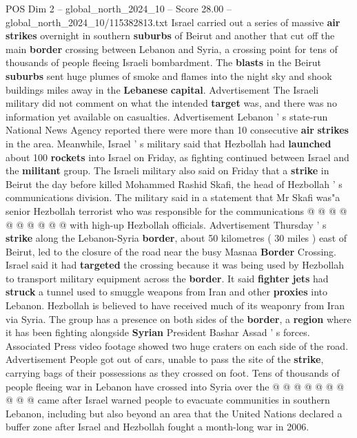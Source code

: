 \begin{textsample}{POS Dim 2 – global\_north\_2024\_10 – Score 28.00 – global\_north\_2024\_10/115382813.txt}  \label{ex:f2_pos_074}
Israel carried out a series of massive \textbf{air} \textbf{strikes} overnight in southern \textbf{suburbs} of Beirut and another that cut off the main \textbf{border} crossing between Lebanon and Syria, a crossing point for tens of thousands of people fleeing Israeli bombardment.
The \textbf{blasts} in the Beirut \textbf{suburbs} sent huge plumes of smoke and flames into the night sky and shook buildings miles away in the \textbf{Lebanese} \textbf{capital}.
Advertisement The Israeli military did not comment on what the intended \textbf{target} was, and there was no information yet available on casualties.
Advertisement Lebanon ' s state-run National News Agency reported there were more than 10 consecutive \textbf{air} \textbf{strikes} in the area.
Meanwhile, Israel ' s military said that Hezbollah had \textbf{launched} about 100 \textbf{rockets} into Israel on Friday, as fighting continued between Israel and the \textbf{militant} group.
The Israeli military also said on Friday that a \textbf{strike} in Beirut the day before killed Mohammed Rashid Skafi, the head of Hezbollah ' s communications division.
The military said in a statement that Mr Skafi was"a senior Hezbollah terrorist who was responsible for the communications @ @ @ @ @ @ @ @ @ @ with high-up Hezbollah officials.
Advertisement Thursday ' s \textbf{strike} along the Lebanon-Syria \textbf{border}, about 50 kilometres ( 30 miles ) east of Beirut, led to the closure of the road near the busy Masnaa \textbf{Border} Crossing.
Israel said it had \textbf{targeted} the crossing because it was being used by Hezbollah to transport military equipment across the \textbf{border}.
It said \textbf{fighter} \textbf{jets} had \textbf{struck} a tunnel used to smuggle weapons from Iran and other \textbf{proxies} into Lebanon.
Hezbollah is believed to have received much of its weaponry from Iran via Syria.
The group has a presence on both sides of the \textbf{border}, a \textbf{region} where it has been fighting alongside \textbf{Syrian} President Bashar Assad ' s forces.
Associated Press video footage showed two huge craters on each side of the road.
Advertisement People got out of cars, unable to pass the site of the \textbf{strike}, carrying bags of their possessions as they crossed on foot.
Tens of thousands of people fleeing war in Lebanon have crossed into Syria over the @ @ @ @ @ @ @ @ @ @ came after Israel warned people to evacuate communities in southern Lebanon, including but also beyond an area that the United Nations declared a buffer zone after Israel and Hezbollah fought a month-long war in 2006.

\end{textsample}

